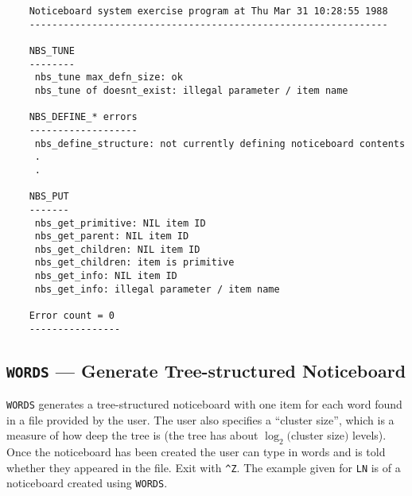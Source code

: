 \begin {verbatim}
    Noticeboard system exercise program at Thu Mar 31 10:28:55 1988
    ---------------------------------------------------------------

    NBS_TUNE
    --------
     nbs_tune max_defn_size: ok
     nbs_tune of doesnt_exist: illegal parameter / item name

    NBS_DEFINE_* errors
    -------------------
     nbs_define_structure: not currently defining noticeboard contents
     .
     .

    NBS_PUT
    -------
     nbs_get_primitive: NIL item ID
     nbs_get_parent: NIL item ID
     nbs_get_children: NIL item ID
     nbs_get_children: item is primitive
     nbs_get_info: NIL item ID
     nbs_get_info: illegal parameter / item name

    Error count = 0
    ----------------
\end{verbatim}

\subsection {{\tt WORDS} --- Generate Tree-structured Noticeboard}

{\tt WORDS} generates a tree-structured noticeboard with one item for each
word found in a file provided by the user. The user also specifies a ``cluster
size'', which is a measure of how deep the tree is (the tree has about
$\log_{2} ($cluster size$)$ levels). Once the noticeboard has been created
the user can type in words and is told whether they appeared in the file.
Exit with \verb|^Z|. The example given for {\tt LN} is of a noticeboard
created using {\tt WORDS}.


